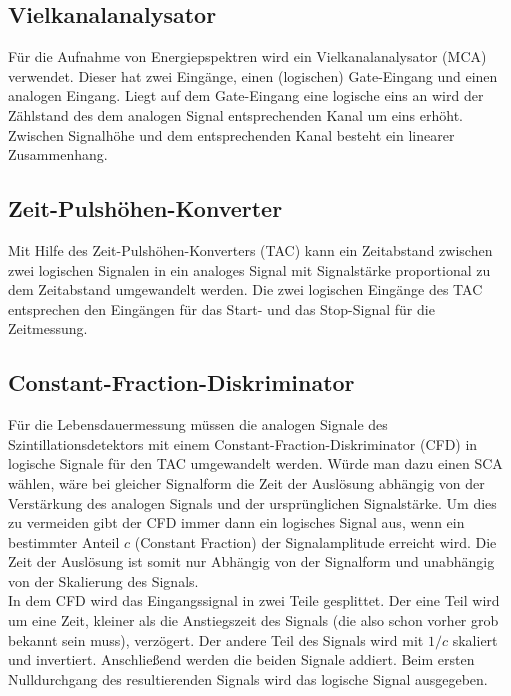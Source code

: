 \subsection{Vielkanalanalysator}
Für die Aufnahme von Energiepspektren wird ein Vielkanalanalysator (MCA) verwendet. Dieser hat zwei Eingänge, einen (logischen) Gate-Eingang und einen analogen Eingang. Liegt auf dem Gate-Eingang eine logische eins an wird der Zählstand des dem analogen Signal entsprechenden Kanal um eins erhöht. Zwischen Signalhöhe und dem entsprechenden Kanal besteht ein linearer Zusammenhang. 

\subsection{Zeit-Pulshöhen-Konverter}
Mit Hilfe des Zeit-Pulshöhen-Konverters (TAC) kann ein Zeitabstand zwischen zwei logischen Signalen in ein analoges Signal mit Signalstärke proportional zu dem Zeitabstand umgewandelt werden. Die zwei logischen Eingänge des TAC entsprechen den Eingängen für das Start- und das Stop-Signal für die Zeitmessung. 

\subsection{Constant-Fraction-Diskriminator}
Für die Lebensdauermessung müssen die analogen Signale des Szintillationsdetektors mit einem Constant-Fraction-Diskriminator (CFD) in logische Signale für den TAC umgewandelt werden. Würde man dazu einen SCA wählen, wäre bei gleicher Signalform die Zeit der Auslösung abhängig von der Verstärkung des analogen Signals und der ursprünglichen Signalstärke. Um dies zu vermeiden gibt der CFD immer dann ein logisches Signal aus, wenn ein bestimmter Anteil $c$ (Constant Fraction) der Signalamplitude erreicht wird. Die Zeit der Auslösung ist somit nur Abhängig von der Signalform und unabhängig von der Skalierung des Signals. \\

In dem CFD wird das Eingangssignal in zwei Teile gesplittet. Der eine Teil wird um eine Zeit, kleiner als die Anstiegszeit des Signals (die also schon vorher grob bekannt sein muss), verzögert. Der andere Teil des Signals wird mit $1/c$ skaliert und invertiert. Anschließend werden die beiden Signale addiert. Beim ersten Nulldurchgang des resultierenden Signals wird das logische Signal ausgegeben.

